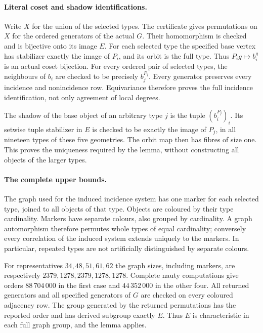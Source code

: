 \documentclass[11pt]{article}
\begin{document}
\paragraph{Literal coset and shadow identifications.}
Write $X$ for the union of the selected types. The certificate gives
permutations on $X$ for the ordered generators of the actual $G$.
Their homomorphism is checked and is bijective onto its image $E$.
For each selected type the specified base vertex has stabilizer exactly
the image of $P_i$, and its orbit is the full type. Thus
$P_i g\mapsto b_i^g$ is an actual coset bijection.
For every ordered pair of selected types, the neighbours of $b_i$
are checked to be precisely $b_j^{P_i}$. Every generator preserves
every incidence and nonincidence row. Equivariance therefore proves
the full incidence identification, not only agreement of local degrees.

The shadow of the base object of an arbitrary type $j$ is the tuple
$(b_i^{P_j})_i$. Its setwise tuple stabilizer in $E$ is checked to be
exactly the image of $P_j$, in all nineteen types of these five geometries.
The orbit map then has fibres of size one. This proves the uniqueness
required by the lemma, without constructing all objects of the larger types.

\paragraph{The complete upper bounds.}
The graph used for the induced incidence system has one marker for
each selected type, joined to all objects of that type. Objects are
coloured by their type cardinality. Markers have separate colours,
also grouped by cardinality. A graph automorphism therefore permutes
whole types of equal cardinality; conversely every correlation of the
induced system extends uniquely to the markers. In particular, repeated
types are not artificially distinguished by separate colours.

For representatives $34,48,51,61,62$ the graph sizes, including markers,
are respectively $2379,1278,2379,1278,1278$. Complete nauty computations
give orders $88\,704\,000$ in the first case and $44\,352\,000$ in
the other four. All returned generators and all specified generators
of $G$ are checked on every coloured adjacency row. The group generated
by the returned permutations has the reported order and has derived
subgroup exactly $E$. Thus $E$ is characteristic in each full graph
group, and the lemma applies.
\end{document}
